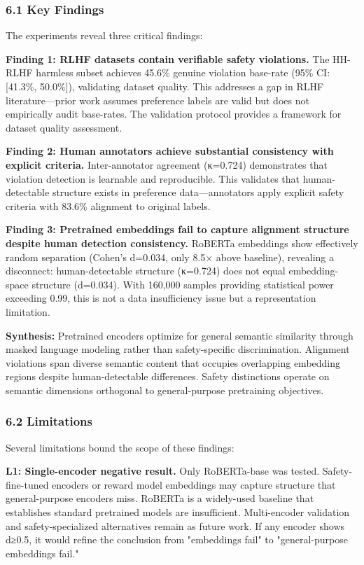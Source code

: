 
\subsubsection{6.1 Key Findings}

The experiments reveal three critical findings:

\textbf{Finding 1: RLHF datasets contain verifiable safety violations.} The HH-RLHF harmless subset achieves 45.6\% genuine violation base-rate (95\% CI: [41.3\%, 50.0\%]), validating dataset quality. This addresses a gap in RLHF literature—prior work assumes preference labels are valid but does not empirically audit base-rates. The validation protocol provides a framework for dataset quality assessment.

\textbf{Finding 2: Human annotators achieve substantial consistency with explicit criteria.} Inter-annotator agreement (κ=0.724) demonstrates that violation detection is learnable and reproducible. This validates that human-detectable structure exists in preference data—annotators apply explicit safety criteria with 83.6\% alignment to original labels.

\textbf{Finding 3: Pretrained embeddings fail to capture alignment structure despite human detection consistency.} RoBERTa embeddings show effectively random separation (Cohen's d=0.034, only 8.5× above baseline), revealing a disconnect: human-detectable structure (κ=0.724) does not equal embedding-space structure (d=0.034). With 160,000 samples providing statistical power exceeding 0.99, this is not a data insufficiency issue but a representation limitation.

\textbf{Synthesis:} Pretrained encoders optimize for general semantic similarity through masked language modeling rather than safety-specific discrimination. Alignment violations span diverse semantic content that occupies overlapping embedding regions despite human-detectable differences. Safety distinctions operate on semantic dimensions orthogonal to general-purpose pretraining objectives.

\subsubsection{6.2 Limitations}

Several limitations bound the scope of these findings:

\textbf{L1: Single-encoder negative result.} Only RoBERTa-base was tested. Safety-fine-tuned encoders or reward model embeddings may capture structure that general-purpose encoders miss. RoBERTa is a widely-used baseline that establishes standard pretrained models are insufficient. Multi-encoder validation and safety-specialized alternatives remain as future work. If any encoder shows d≥0.5, it would refine the conclusion from "embeddings fail" to "general-purpose embeddings fail."

